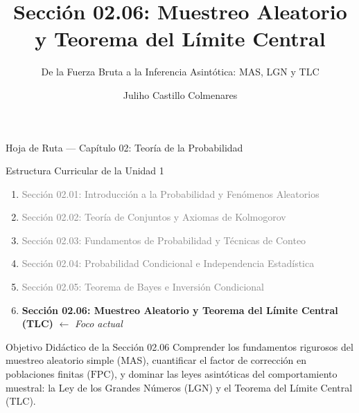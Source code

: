 \documentclass[10pt, aspectratio=169]{beamer}
\title[Muestreo Aleatorio y TLC]{Sección 02.06: Muestreo Aleatorio y Teorema del Límite Central}
\subtitle{De la Fuerza Bruta a la Inferencia Asintótica: MAS, LGN y TLC}
\author[J. Castillo Colmenares]{Juliho Castillo Colmenares}
\institute{Tecnológico de Monterrey}
\date{\vspace{-2.0cm}}
\begin{document}
\begin{frame}[plain]
  \vspace{-0.5cm}
  \titlepage
\end{frame}

\begin{frame}{Hoja de Ruta --- Capítulo 02: Teoría de la Probabilidad}
  \begin{block}{Estructura Curricular de la Unidad 1}
    \footnotesize
    \begin{enumerate}\itemsep=0.08cm
      \item \textcolor{gray}{Sección 02.01: Introducción a la Probabilidad y Fenómenos Aleatorios}
      \item \textcolor{gray}{Sección 02.02: Teoría de Conjuntos y Axiomas de Kolmogorov}
      \item \textcolor{gray}{Sección 02.03: Fundamentos de Probabilidad y Técnicas de Conteo}
      \item \textcolor{gray}{Sección 02.04: Probabilidad Condicional e Independencia Estadística}
      \item \textcolor{gray}{Sección 02.05: Teorema de Bayes e Inversión Condicional}
      \item \textbf{\textcolor{TecRojo}{Sección 02.06: Muestreo Aleatorio y Teorema del Límite Central (TLC)}} $\leftarrow$ \emph{Foco actual}
    \end{enumerate}
  \end{block}
  \vspace{-0.05cm}
  \pause
  \begin{alertblock}{Objetivo Didáctico de la Sección 02.06}
    \footnotesize
    Comprender los fundamentos rigurosos del muestreo aleatorio simple (MAS), cuantificar el factor de corrección en poblaciones finitas ($\text{FPC}$), y dominar las leyes asintóticas del comportamiento muestral: la Ley de los Grandes Números (LGN) y el Teorema del Límite Central (TLC).
  \end{alertblock}
\end{frame}
\end{document}

